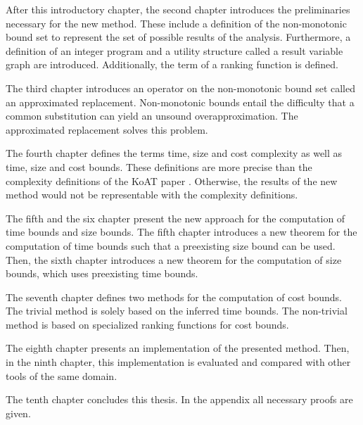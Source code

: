 After this introductory chapter, the second chapter introduces the preliminaries necessary for the new method.
These include a definition of the non-monotonic bound set to represent the set of possible results of the analysis.
Furthermore, a definition of an integer program and a utility structure called a result variable graph are introduced.
Additionally, the term of a ranking function is defined.

The third chapter introduces an operator on the non-monotonic bound set called an approximated replacement.
Non-monotonic bounds entail the difficulty that a common substitution can yield an unsound overapproximation.
The approximated replacement solves this problem.

The fourth chapter defines the terms time, size and cost complexity as well as time, size and cost bounds.
These definitions are more precise than the complexity definitions of the KoAT paper \cite{koat}.
Otherwise, the results of the new method would not be representable with the complexity definitions.

The fifth and the six chapter present the new approach for the computation of time bounds and size bounds.
The fifth chapter introduces a new theorem for the computation of time bounds such that a preexisting size bound can be used.
Then, the sixth chapter introduces a new theorem for the computation of size bounds, which uses preexisting time bounds.

The seventh chapter defines two methods for the computation of cost bounds.
The trivial method is solely based on the inferred time bounds.
The non-trivial method is based on specialized ranking functions for cost bounds.

The eighth chapter presents an implementation of the presented method.
Then, in the ninth chapter, this implementation is evaluated and compared with other tools of the same domain.

The tenth chapter concludes this thesis.
In the appendix all necessary proofs are given.
